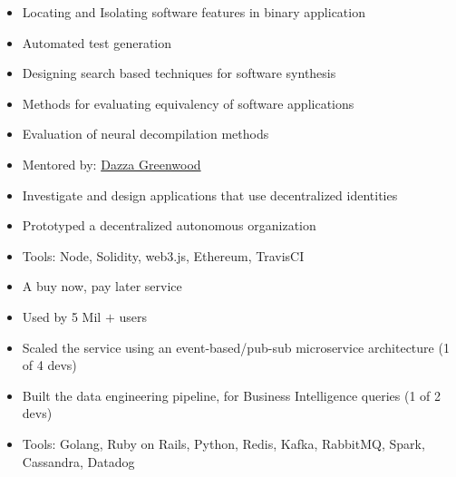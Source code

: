 \documentclass[11pt,a4paper,sans]{moderncv}
\begin{document}
{
    \begin{itemize}
    \item Locating and Isolating software features in binary application
    \item Automated test generation
    \item Designing search based techniques for software synthesis
    \item Methods for evaluating equivalency of software applications
    \item Evaluation of neural decompilation methods
    \end{itemize}
}

{
    \begin{itemize}
    \item Mentored by: \href{https://web.media.mit.edu/~dang/}{Dazza Greenwood}
    \item Investigate and design applications that use decentralized identities
    \item Prototyped a decentralized autonomous organization
    \item Tools: Node, Solidity, web3.js, Ethereum, TravisCI
    \end{itemize}
}

{
    \begin{itemize}
    \item A buy now, pay later service
    \item Used by 5 Mil $+$ users
    \item Scaled the service using an event-based/pub-sub microservice
    architecture (1 of 4 devs)
    \item Built the data engineering pipeline, for Business Intelligence queries
    (1 of 2 devs)
    \item Tools: Golang, Ruby on Rails, Python, Redis, Kafka, RabbitMQ, Spark,
    Cassandra, Datadog
    \end{itemize}
}

\end{document}
